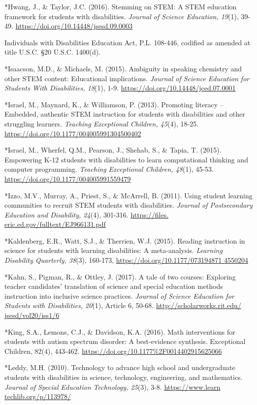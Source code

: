 \documentclass[11pt]{sig-alternate}
\begin{document}
\begin{large}
*Hwang, J., \& Taylor, J.C. (2016). Stemming on STEM: A STEM education framework for students with disabilities. \textit{Journal of Science Education, 19}(1), 39-49. \url{https://doi.org/10.14448/jsesd.09.0003}

Individuals with Disabilities Education Act, P.L. 108-446, codified as amended at title U.S.C. §20 U.S.C. 1400(d).

*Isaacson, M.D., \& Michaels, M. (2015). Ambiguity in speaking chemistry and other STEM content: Educational implications. \textit{Journal of Science Education for Students With Disabilities, 18}(1), 1-9. \url{https://doi.org/10.14448/jced.07.0001}

*Israel, M., Maynard, K., \& Williamson, P. (2013). Promoting literacy – Embedded, authentic STEM instruction for students with disabilities and other struggling learners.\textit{ Teaching Exceptional Children, 45}(4), 18-25. \url{https://doi.org/10.1177/004005991304500402}

*Israel, M., Wherfel, Q.M., Pearson, J., Shehab, S., \& Tapia, T. (2015). Empowering K-12 students with disabilities to learn computational thinking and computer programming. \textit{Teaching Exceptional Children, 48}(1), 45-53. \url{https://doi.org/10.1177/004005991559479}

*Izzo, M.V., Murray, A., Priest, S., \& McArrell, B. (2011). Using student learning communities to recruit STEM students with disabilities. \textit{Journal of Postsecondary Education and Disability, 24}(4), 301-316. \url{https://files. eric.ed.gov/fulltext/EJ966131.pdf}

*Kaldenberg, E.R., Watt, S.J., \& Therrien, W.J. (2015). Reading instruction in science for students with learning disabilities: A meta-analysis.\textit{ Learning Disability Quarterly, 38}(3), 160-173, \url{https://doi.org/10.1177/073194871 4550204}

*Kahn, S., Pigman, R., \& Ottley, J. (2017). A tale of two courses: Exploring teacher candidates’ translation of science and special education methods instruction into inclusive science practices. \textit{Journal of Science Education for Students with Disabilities, 20}(1), Article 6, 50-68. \url{http://scholarworks.rit.edu/ jsesd/vol20/iss1/6}

*King, S.A., Lemons, C.J., \& Davidson, K.A. (2016). Math interventions for students with autism spectrum disorder: A best-evidence synthesis. Exceptional Children, 82(4), 443-462. \url{https://doi.org/10.1177%2F0014402915625066}

*Leddy, M.H. (2010). Technology to advance high school and undergraduate students with disabilities in science, technology, engineering, and mathematics. \textit{Journal of Special Education Technology, 25}(3), 3-8. \url{https://www.learn techlib.org/p/113978/}


\end{large}
\end{document}
